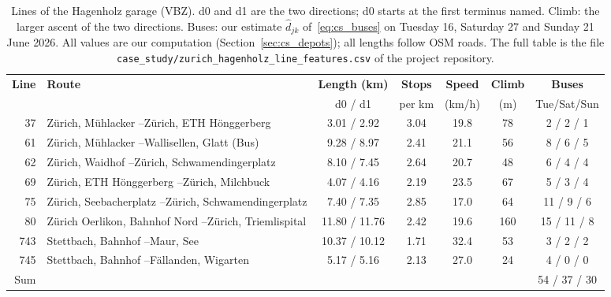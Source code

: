 \documentclass[11pt,a4paper]{article}
\theoremstyle{plain}
\theoremstyle{definition}
\theoremstyle{remark}
\begin{document}
\begin{table}[htbp]
\centering
\caption{Lines of the Hagenholz garage (VBZ).
d0 and d1 are the two directions; d0 starts at the first terminus named.
Climb: the larger ascent of the two directions.
Buses: our estimate $\hat d_{jk}$ of~\eqref{eq:cs_buses} on Tuesday 16, Saturday 27 and Sunday 21 June 2026.
All values are our computation (Section~\ref{sec:cs_depots}); all lengths follow OSM roads.
The full table is the file \nolinkurl{case_study/zurich_hagenholz_line_features.csv} of the project repository.}
\label{tab:cs_lines_hagenholz}
\small
\setlength{\tabcolsep}{4pt}
\begin{tabularx}{\linewidth}{@{}r>{\hsize=1.000\hsize\raggedright\arraybackslash}Xccccc@{}}
\toprule
\rowcolor{headgrey}
\textbf{Line} & \textbf{Route} & \textbf{Length (km)} & \textbf{Stops} & \textbf{Speed} & \textbf{Climb} & \textbf{Buses} \\
 & & d0 / d1 & per km & (km/h) & (m) & Tue/Sat/Sun \\
\midrule
37 & Z\"urich, M\"uhlacker --\newline Z\"urich, ETH H\"onggerberg & 3.01 / 2.92 & 3.04 & 19.8 & 78 & 2 / 2 / 1 \\
61 & Z\"urich, M\"uhlacker --\newline Wallisellen, Glatt (Bus) & 9.28 / 8.97 & 2.41 & 21.1 & 56 & 8 / 6 / 5 \\
62 & Z\"urich, Waidhof --\newline Z\"urich, Schwamendingerplatz & 8.10 / 7.45 & 2.64 & 20.7 & 48 & 6 / 4 / 4 \\
69 & Z\"urich, ETH H\"onggerberg --\newline Z\"urich, Milchbuck & 4.07 / 4.16 & 2.19 & 23.5 & 67 & 5 / 3 / 4 \\
75 & Z\"urich, Seebacherplatz --\newline Z\"urich, Schwamendingerplatz & 7.40 / 7.35 & 2.85 & 17.0 & 64 & 11 / 9 / 6 \\
80 & Z\"urich Oerlikon, Bahnhof Nord --\newline Z\"urich, Triemlispital & 11.80 / 11.76 & 2.42 & 19.6 & 160 & 15 / 11 / 8 \\
743 & Stettbach, Bahnhof --\newline Maur, See & 10.37 / 10.12 & 1.71 & 32.4 & 53 & 3 / 2 / 2 \\
745 & Stettbach, Bahnhof --\newline F\"allanden, Wigarten & 5.17 / 5.16 & 2.13 & 27.0 & 24 & 4 / 0 / 0 \\
\midrule
Sum & & & & & & 54 / 37 / 30 \\
\bottomrule
\end{tabularx}
\end{table}
\end{document}
